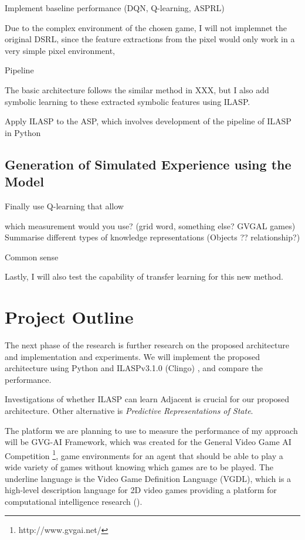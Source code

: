 \documentclass[12pt,twoside]{report}
\begin{document}
Implement baseline performance (DQN, Q-learning, ASPRL)

Due to the complex environment of the chosen game, I will not implemnet the original DSRL, since the feature extractions from the pixel would only work in a very simple pixel environment,

Pipeline

The basic architecture follows the similar method in XXX, but I also add symbolic learning to these extracted symbolic features using ILASP.

Apply ILASP to the ASP, which involves development of the pipeline of ILASP in Python


\subsection{Generation of Simulated Experience using the Model}

Finally use Q-learning that allow

which measurement would you use? (grid word, something else? GVGAL games)
Summarise different types of knowledge representations (Objects ?? relationship?)

Common sense

Lastly, I will also test the capability of transfer learning for this new method.

\section{Project Outline}

The next phase of the research is further research on the proposed architecture and implementation and experiments. We will implement the proposed architecture using Python and ILASPv3.1.0 (Clingo) \cite{Law2017}, and compare the performance.

Investigations of whether ILASP can learn Adjacent is crucial for our proposed architecture. 
Other alternative is \textit{Predictive Representations of State}. 

The platform we are planning to use to measure the performance of my approach will be GVG-AI Framework, which was created for the General Video Game AI Competition \footnote{http://www.gvgai.net/}, game environments for an agent that should be able to play a wide variety of games without knowing which games are to be played.
The underline language is the Video Game Definition Language (VGDL), which is a high-level description language for 2D video games providing a platform for computational intelligence research (\cite{Schaul2013}).
\end{document}

